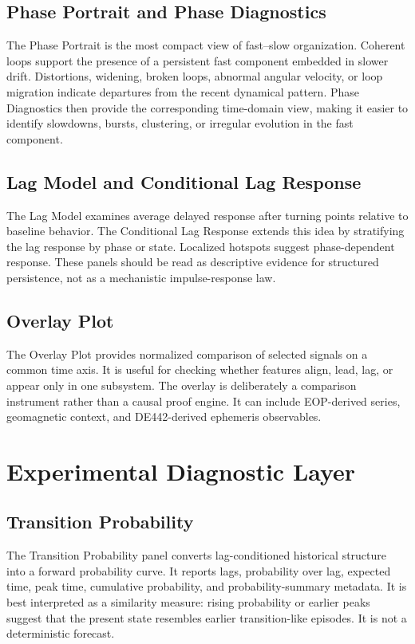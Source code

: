 \documentclass[11pt]{article}
\begin{document}
\subsection{Phase Portrait and Phase Diagnostics}
The Phase Portrait is the most compact view of fast--slow organization. Coherent loops support the presence of a persistent fast component embedded in slower drift. Distortions, widening, broken loops, abnormal angular velocity, or loop migration indicate departures from the recent dynamical pattern. Phase Diagnostics then provide the corresponding time-domain view, making it easier to identify slowdowns, bursts, clustering, or irregular evolution in the fast component.

\subsection{Lag Model and Conditional Lag Response}
The Lag Model examines average delayed response after turning points relative to baseline behavior. The Conditional Lag Response extends this idea by stratifying the lag response by phase or state. Localized hotspots suggest phase-dependent response. These panels should be read as descriptive evidence for structured persistence, not as a mechanistic impulse-response law.

\subsection{Overlay Plot}
The Overlay Plot provides normalized comparison of selected signals on a common time axis. It is useful for checking whether features align, lead, lag, or appear only in one subsystem. The overlay is deliberately a comparison instrument rather than a causal proof engine. It can include EOP-derived series, geomagnetic context, and DE442-derived ephemeris observables.

\section{Experimental Diagnostic Layer}
\subsection{Transition Probability}
The Transition Probability panel converts lag-conditioned historical structure into a forward probability curve. It reports lags, probability over lag, expected time, peak time, cumulative probability, and probability-summary metadata. It is best interpreted as a similarity measure: rising probability or earlier peaks suggest that the present state resembles earlier transition-like episodes. It is not a deterministic forecast.
\end{document}
